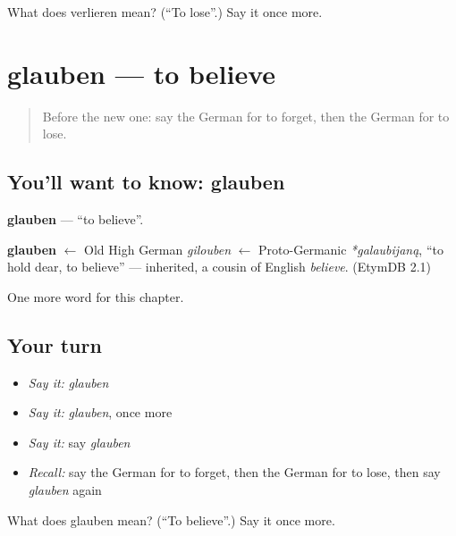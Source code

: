 \begin{tcolorbox}[breakable,colback=teal!4,colframe=teal!35!black,title={Before you move on}]
What does verlieren mean? (\textquotedblleft{}To lose\textquotedblright{}.) Say it once more.
\end{tcolorbox}
\section[glauben]{glauben — to believe}

\label{lesson:GE-C67-glauben}



\begin{quote}
Before the new one: say the German for to forget, then the German for to lose.
\end{quote}

\subsection*{You'll want to know: glauben}
\textbf{glauben} — \textquotedblleft{}to believe\textquotedblright{}.

\begin{cousinweb}
\textbf{glauben} $\leftarrow$ Old High German \emph{gilouben} $\leftarrow$ Proto-Germanic \emph{*galaubijaną}, \textquotedblleft{}to hold dear, to believe\textquotedblright{} — inherited, a cousin of English \emph{believe}. (EtymDB 2.1)
\end{cousinweb}

\begin{grammarlens}[title={What you've built}]
One more word for this chapter.
\end{grammarlens}

\subsection*{Your turn}
\begin{itemize}
\raggedright
  \item \emph{Say it:} \emph{glauben}
  \item \emph{Say it:} \emph{glauben}, once more
  \item \emph{Say it:} say \emph{glauben}
  \item \emph{Recall:} say the German for to forget, then the German for to lose, then say \emph{glauben} again
\end{itemize}

\begin{tcolorbox}[breakable,colback=teal!4,colframe=teal!35!black,title={Before you move on}]
What does glauben mean? (\textquotedblleft{}To believe\textquotedblright{}.) Say it once more.
\end{tcolorbox}
